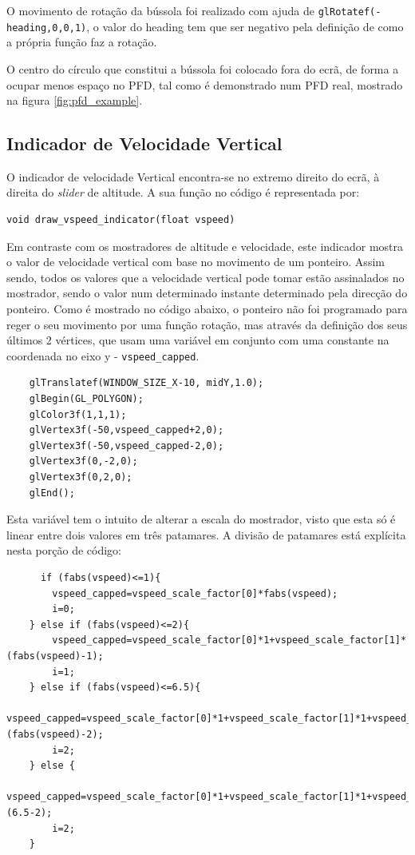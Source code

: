 \documentclass[palatino]{ist-report}
\begin{document}
O movimento de rotação da bússola foi realizado com ajuda de \texttt{glRotatef(-heading,0,0,1)}, o valor do heading tem que ser negativo pela definição de como a própria função faz a rotação.

O centro do círculo que constitui a bússola foi colocado fora do ecrã, de forma a ocupar menos espaço no PFD, tal como é demonstrado num PFD real, mostrado na figura \ref{fig:pfd_example}.


\subsection{Indicador de Velocidade Vertical}
O indicador de velocidade Vertical encontra-se no extremo direito do ecrã, à direita do \textit{slider} de altitude. A sua função no código é representada por:

\begin{verbatim}
void draw_vspeed_indicator(float vspeed)
\end{verbatim}

Em contraste com os mostradores de altitude e velocidade, este indicador mostra o valor de velocidade vertical com base no movimento de um ponteiro. Assim sendo, todos os valores que a velocidade vertical pode tomar estão assinalados no mostrador, sendo o valor num determinado instante determinado pela direcção do ponteiro. Como é mostrado no código abaixo, o ponteiro não foi programado para reger o seu movimento por uma função rotação, mas através da definição dos seus últimos 2 vértices, que usam uma variável em conjunto com uma constante na coordenada no eixo y - \texttt{vspeed_capped}.   

\begin{verbatim}
    glTranslatef(WINDOW_SIZE_X-10, midY,1.0);
    glBegin(GL_POLYGON);
    glColor3f(1,1,1);
    glVertex3f(-50,vspeed_capped+2,0);
    glVertex3f(-50,vspeed_capped-2,0);
    glVertex3f(0,-2,0);
    glVertex3f(0,2,0);
    glEnd();
\end{verbatim}

Esta variável tem o intuito de alterar a escala do mostrador, visto que esta só é linear entre dois valores em três patamares. A divisão de patamares está explícita nesta porção de código:

\begin{verbatim}
      if (fabs(vspeed)<=1){
        vspeed_capped=vspeed_scale_factor[0]*fabs(vspeed);
        i=0;
    } else if (fabs(vspeed)<=2){
        vspeed_capped=vspeed_scale_factor[0]*1+vspeed_scale_factor[1]*(fabs(vspeed)-1);
        i=1;
    } else if (fabs(vspeed)<=6.5){
        vspeed_capped=vspeed_scale_factor[0]*1+vspeed_scale_factor[1]*1+vspeed_scale_factor[2]*(fabs(vspeed)-2);
        i=2;
    } else {
        vspeed_capped=vspeed_scale_factor[0]*1+vspeed_scale_factor[1]*1+vspeed_scale_factor[2]*(6.5-2);
        i=2;
    }
\end{verbatim}
\end{document}

